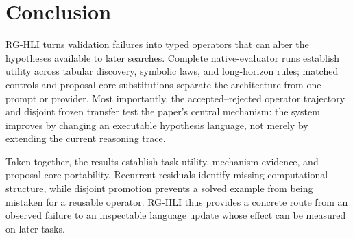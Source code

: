 \documentclass[letterpaper]{article}
\newcommand{\methodshort}{\textsc{RG-HLI}\xspace}
\begin{document}
\section{Conclusion}

\methodshort turns validation failures into typed operators that can alter the
hypotheses available to later searches. Complete native-evaluator runs establish
utility across tabular discovery, symbolic laws, and long-horizon rules; matched
controls and proposal-core substitutions separate the architecture from one
prompt or provider. Most importantly, the accepted--rejected operator trajectory
and disjoint frozen transfer test the paper's central mechanism: the system
improves by changing an executable hypothesis language, not merely by extending
the current reasoning trace.

Taken together, the results establish task utility, mechanism evidence, and
proposal-core portability. Recurrent residuals identify missing computational
structure, while disjoint promotion prevents a solved example from being
mistaken for a reusable operator. RG-HLI thus provides a concrete route from an
observed failure to an inspectable language update whose effect can be measured
on later tasks.

\end{document}
